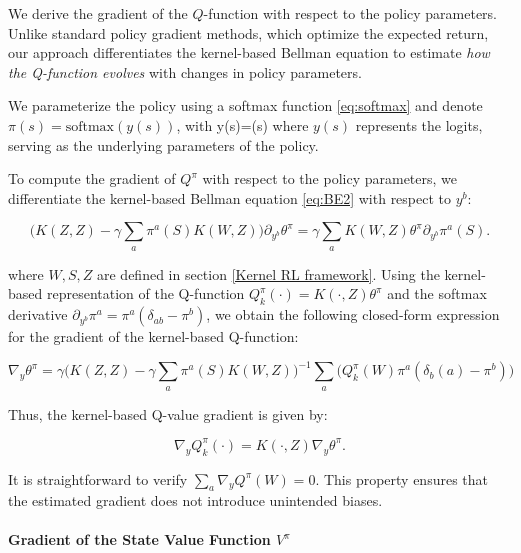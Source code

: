 \documentclass[
]{article}
\def\({}%
\def\){}%
\numberwithin{equation}{section}
\begin{document}
We derive the gradient of the $Q$-function with respect to the policy parameters. Unlike standard policy gradient methods, which optimize the expected return, our approach differentiates the kernel-based Bellman equation to estimate \textit{how the Q-function evolves} with changes in policy parameters. 

We parameterize the policy using a softmax function \eqref{eq:softmax} and denote $\pi(s) = \text{softmax}(y(s))$, with
\(y(s)=\ln \pi(s)\)
where $y(s)$ represents the logits, serving as the underlying parameters of the policy. 


To compute the gradient of $Q^\pi$ with respect to the policy parameters, we differentiate the kernel-based Bellman equation \eqref{eq:BE2} with respect to $y^b$:

\begin{equation} 
\Big( K(Z, Z) - \gamma \sum_a \pi^a(S) K(W,Z) \Big)\partial_{y^b}\theta^\pi = \gamma \sum_a  K(W,Z)\theta^\pi \partial_{y^b} \pi^a(S).
\end{equation}

where $W, S, Z$ are defined in section \ref{Kernel RL framework}. Using the kernel-based representation of the Q-function $Q^{\pi}_k(\cdot) = K(\cdot,Z) \theta^\pi$ and the softmax derivative $\partial_{y^b} \pi^a = \pi^a (\delta_{ab} - \pi^b)$, we obtain the following closed-form expression for the gradient of the kernel-based Q-function:

\begin{equation} \label{gradientBE}
 \nabla_{y} \theta^\pi = \gamma \Big(K(Z,Z) - \gamma \sum_a \pi^a(S) K(W,Z) \Big)^{-1} \sum_a\Big(Q^{\pi}_k(W) \pi^a(\delta_b(a)-\pi^b)\Big)
\end{equation}

Thus, the kernel-based Q-value gradient is given by:

\begin{equation}
\nabla_{y} Q^\pi_k(\cdot) = K(\cdot, Z) \nabla_{y} \theta^\pi.
\end{equation}

It is straightforward to verify $\sum_a \nabla_{y} Q^\pi(W) = 0$. This property ensures that the estimated gradient does not introduce unintended biases. 
  


\paragraph*{Gradient of the State Value Function $V^\pi$}
\end{document}
